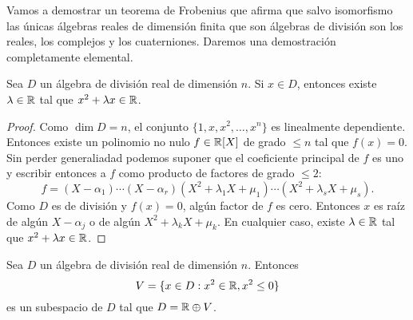 \lecture{}


Vamos a demostrar un teorema de Frobenius que afirma que salvo isomorfismo las únicas 
álgebras reales de dimensión finita que son álgebras de división son los
reales, los complejos y los cuaterniones. Daremos una demostración
completamente elemental.

\begin{lemma}
	\label{lem:trick_frobenius1}
	Sea $D$ un álgebra de división real de dimensión $n$. Si $x\in D$, entonces
	existe $\lambda\in\mathbb{R}$ tal que $x^2+\lambda x\in\mathbb{R}$.
\end{lemma}

\begin{proof}
	Como $\dim D=n$, el conjunto $\{1,x,x^2,\dots,x^n\}$ es linealmente
	dependiente. Entonces existe un polinomio no nulo $f\in\mathbb{R}[X]$ de grado
	$\leq n$ tal que $f(x)=0$. Sin perder generaliadad podemos suponer que el
	coeficiente principal de $f$ es uno y escribir entonces a $f$ como producto
	de factores de grado $\leq2$:
	\[
		f=(X-\alpha_1)\cdots (X-\alpha_r)(X^2+\lambda_1 X+\mu_1)\cdots (X^2+\lambda_s X+\mu_s).
	\]
	Como $D$ es de división y $f(x)=0$, algún factor de $f$ es cero. Entonces
	$x$ es raíz de algún $X-\alpha_j$ o de algún $X^2+\lambda_k X+\mu_k$. En
	cualquier caso, existe $\lambda\in\mathbb{R}$ tal que $x^2+\lambda x\in\mathbb{R}$. 
\end{proof}

\begin{lemma}
	\label{lem:trick_frobenius2}
	Sea $D$ un álgebra de división real de dimensión $n$. Entonces
	\[
		V=\{x\in D:x^2\in\mathbb{R},x^2\leq 0\}
	\]
	es un subespacio de $D$ tal que $D=\mathbb{R}\oplus V$.
\end{lemma}

